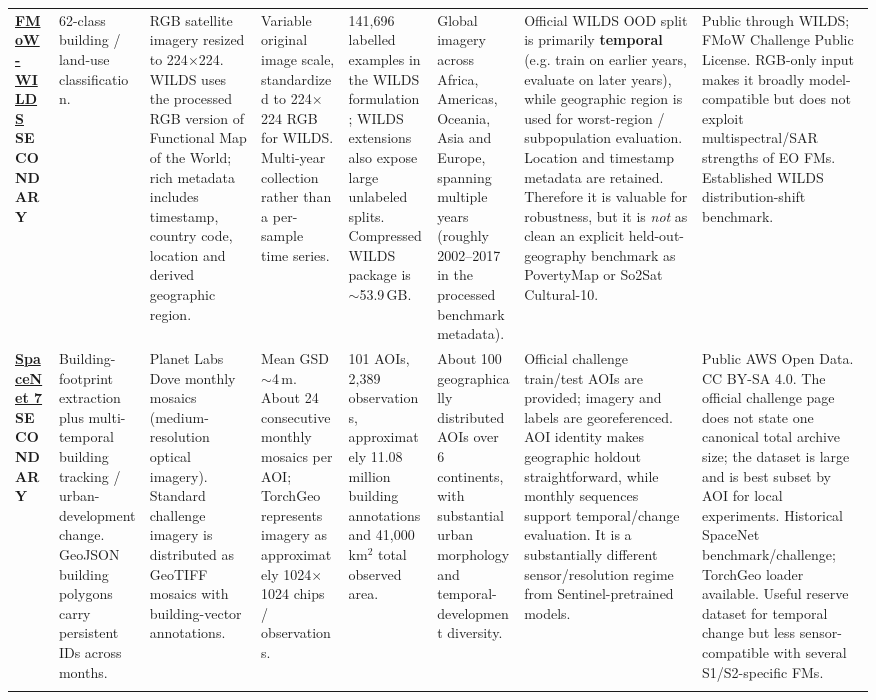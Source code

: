 \documentclass[11pt,a4paper]{article}
\begin{document}
\begin{landscape}
\begin{longtable}{
    Q{1.8cm}
    Q{2.5cm}
    Q{3.0cm}
    Q{2.5cm}
    Q{2.1cm}
    Q{3.0cm}
    Q{3.4cm}
    Q{3.4cm}
}
\href{https://wilds.stanford.edu/datasets/}{\textbf{FMoW-WILDS}}\newline
\textbf{SECONDARY}
&
62-class building / land-use classification.
&
RGB satellite imagery resized to 224$\times$224. WILDS uses the processed RGB version of Functional Map of the World; rich metadata includes timestamp, country code, location and derived geographic region.
&
Variable original image scale, standardized to 224$\times$224 RGB for WILDS. Multi-year collection rather than a per-sample time series.
&
141,696 labelled examples in the WILDS formulation; WILDS extensions also expose large unlabeled splits. Compressed WILDS package is $\sim$53.9\,GB.
&
Global imagery across Africa, Americas, Oceania, Asia and Europe, spanning multiple years (roughly 2002--2017 in the processed benchmark metadata).
&
Official WILDS OOD split is primarily \textbf{temporal} (e.g. train on earlier years, evaluate on later years), while geographic region is used for worst-region / subpopulation evaluation. Location and timestamp metadata are retained. Therefore it is valuable for robustness, but it is \emph{not} as clean an explicit held-out-geography benchmark as PovertyMap or So2Sat Cultural-10.
&
Public through WILDS; FMoW Challenge Public License. RGB-only input makes it broadly model-compatible but does not exploit multispectral/SAR strengths of EO FMs. Established WILDS distribution-shift benchmark.
\\
\addlinespace

\href{https://www.spacenet.ai/sn7-challenge/}{\textbf{SpaceNet 7}}\newline
\textbf{SECONDARY}
&
Building-footprint extraction plus multi-temporal building tracking / urban-development change. GeoJSON building polygons carry persistent IDs across months.
&
Planet Labs Dove monthly mosaics (medium-resolution optical imagery). Standard challenge imagery is distributed as GeoTIFF mosaics with building-vector annotations.
&
Mean GSD $\sim$4\,m. About 24 consecutive monthly mosaics per AOI; TorchGeo represents imagery as approximately 1024$\times$1024 chips / observations.
&
101 AOIs, 2,389 observations, approximately 11.08 million building annotations and 41,000\,km$^2$ total observed area.
&
About 100 geographically distributed AOIs over 6 continents, with substantial urban morphology and temporal-development diversity.
&
Official challenge train/test AOIs are provided; imagery and labels are georeferenced. AOI identity makes geographic holdout straightforward, while monthly sequences support temporal/change evaluation. It is a substantially different sensor/resolution regime from Sentinel-pretrained models.
&
Public AWS Open Data. CC BY-SA 4.0. The official challenge page does not state one canonical total archive size; the dataset is large and is best subset by AOI for local experiments. Historical SpaceNet benchmark/challenge; TorchGeo loader available. Useful reserve dataset for temporal change but less sensor-compatible with several S1/S2-specific FMs.
\\
\addlinespace


\end{longtable}
\end{landscape}
\end{document}
